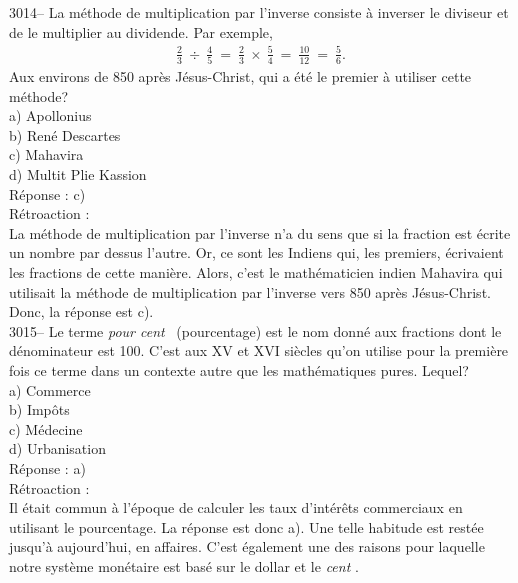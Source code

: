 \documentclass[letterpaper, 12pt]{article}
\begin{document}
3014-- La m\'ethode de multiplication par l'inverse consiste \`a inverser le diviseur et de le multiplier au dividende. Par exemple,
\begin{eqnarray*}
\frac{2}{3} \ \div \ \frac{4}{5} \ = \ \frac{2}{3} \ \times \ \frac{5}{4} \ = \ \frac{10}{12} \ = \ \frac{5}{6}.
\end{eqnarray*}
Aux environs de 850 apr\`es J\'esus-Christ, qui a \'et\'e le premier \`a utiliser cette m\'ethode?\\

a) Apollonius\\
b) Ren\'e Descartes\\
c) Mahavira\\
d) Multit Plie Kassion\\

R\'eponse : c)\\

R\'etroaction :\\
La m\'ethode de multiplication par l'inverse n'a du sens que si la fraction est \'ecrite un nombre par dessus l'autre. Or, ce sont les Indiens qui, les premiers, \'ecrivaient les fractions de cette mani\`ere. Alors, c'est le math\'ematicien indien Mahavira qui utilisait la m\'ethode de multiplication par l'inverse vers 850 apr\`es J\'esus-Christ. Donc, la r\'eponse est c).\\



3015-- Le terme \og \emph{pour cent} \fg \ (pourcentage) est le nom donn\'e aux fractions dont le d\'enominateur est 100. C'est aux {\scriptsize XV\ieme{}} et {\scriptsize XVI\ieme{}} si\`ecles qu'on utilise pour la premi\`ere fois ce terme dans un contexte autre que les math\'ematiques pures. Lequel?\\

a) Commerce\\
b) Imp\^ots\\
c) M\'edecine\\
d) Urbanisation\\

R\'eponse : a)\\

R\'etroaction :\\
Il \'etait commun \`a l'\'epoque de calculer les taux d'int\'er\^ets commerciaux en utilisant le pourcentage. La r\'eponse est donc a). Une telle habitude est rest\'ee jusqu'\`a aujourd'hui, en affaires. C'est \'egalement une des raisons pour laquelle notre syst\`eme mon\'etaire est bas\'e sur le dollar et le \og \emph{cent} \fg.\\
\end{document}
